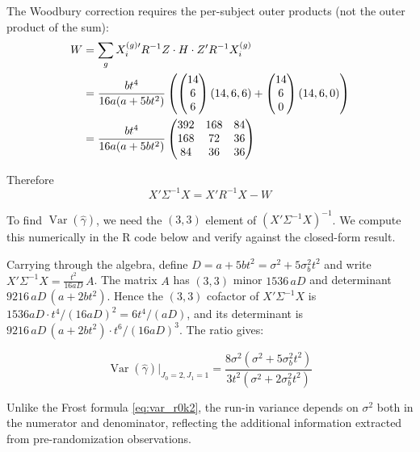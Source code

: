 \documentclass[
  11pt,
]{article}
\begin{document}
The Woodbury correction requires the per-subject outer
products (not the outer product of the sum):
\begin{align}
  W &= \sum_{g} X_i^{(g)\prime} R^{-1} Z
    \cdot H \cdot
    Z' R^{-1} X_i^{(g)} \notag \\
  &= \frac{bt^4}{16a(a+5bt^2)}
    \left(
      \begin{pmatrix}14\\6\\6\end{pmatrix}
      (14,6,6)
      + \begin{pmatrix}14\\6\\0\end{pmatrix}
      (14,6,0)
    \right) \notag \\
  &= \frac{bt^4}{16a(a+5bt^2)}
    \begin{pmatrix}
      392 & 168 & 84 \\
      168 & 72 & 36 \\
      84 & 36 & 36
    \end{pmatrix}
\end{align}

Therefore
\begin{equation}
  X'\Sigma^{-1}X = X'R^{-1}X - W
\end{equation}

To find \(\mathop{\mathrm{Var}}(\hat{\gamma})\), we need the \((3,3)\) element
of \((X'\Sigma^{-1}X)^{-1}\). We compute this numerically in
the R code below and verify against the closed-form result.

Carrying through the algebra, define \(D = a + 5bt^2 =
\sigma^2 + 5\sigma_b^2 t^2\) and write
\(X'\Sigma^{-1}X = \frac{t^2}{16aD}\,A\). The matrix \(A\) has
\((3,3)\) minor \(1536\,aD\) and determinant
\(9216\,aD\,(a+2bt^2)\). Hence the \((3,3)\) cofactor of
\(X'\Sigma^{-1}X\) is
\(1536aD \cdot t^4/(16aD)^2 = 6t^4/(aD)\), and its
determinant is
\(9216\,aD\,(a+2bt^2)\cdot t^6/(16aD)^3\). The ratio
gives:

\begin{equation}
  \boxed{
    \mathop{\mathrm{Var}}(\hat{\gamma})\big|_{J_0=2,J_1=1}
    = \frac{8\sigma^2(\sigma^2 + 5\sigma_b^2 t^2)}
           {3t^2(\sigma^2 + 2\sigma_b^2 t^2)}
  }
  \label{eq:var_r2k1}
\end{equation}

Unlike the Frost formula \eqref{eq:var_r0k2}, the run-in
variance depends on \(\sigma^2\) both in the numerator and
denominator, reflecting the additional information extracted
from pre-randomization observations.
\end{document}
